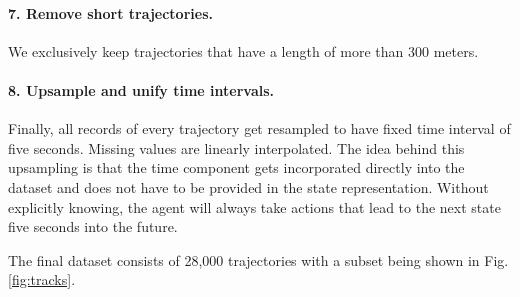 \paragraph{7. Remove short trajectories.}
We exclusively keep trajectories that have a length of more than 300 meters.

\paragraph{8. Upsample and unify time intervals.}
Finally, all records of every trajectory get resampled to have fixed time interval of five seconds. Missing values are linearly interpolated. The idea behind this upsampling is that the time component gets incorporated directly into the dataset and does not have to be provided in the state representation. Without explicitly knowing, the agent will always take actions that lead to the next state five seconds into the future.
\par


The final dataset consists of 28,000 trajectories with a subset being shown in Fig. \ref{fig:tracks}.